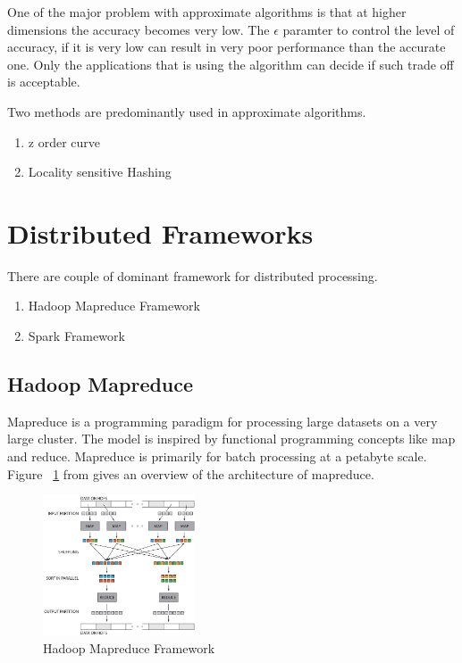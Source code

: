 \documentclass[conference]{IEEEtran}
\begin{document}
\medskip

One of the major problem with approximate algorithms is that at higher
dimensions the accuracy becomes very low. The $\epsilon$ paramter to
control the level of accuracy, if it is very low can result in very
poor performance than the accurate one. Only the applications that is
using the algorithm can decide if such trade off is acceptable.

\medskip

Two methods are predominantly
used in approximate algorithms.
\begin{enumerate}
\item z order curve
\item Locality sensitive Hashing
\end{enumerate}

\bigskip

\section{Distributed Frameworks}

There are couple of dominant framework for distributed processing.
\begin{enumerate}
\item Hadoop Mapreduce Framework \cite{_hadoop_mr}
\item Spark Framework \cite{_apache_spark}
\end{enumerate}

\subsection{Hadoop Mapreduce}
Mapreduce\cite{dean_mapreduce:_2008} is a programming paradigm for processing large datasets on a
very large cluster. The model is inspired by functional programming concepts like
map and reduce. Mapreduce is primarily for batch processing at a
petabyte scale. Figure ~\ref{fig:hadooparch} from \cite{_hadoop_mr_arch} gives an overview of the architecture of
mapreduce.

\begin{figure}[here]
\includegraphics[width=0.4\textwidth]{hadooparch.jpg}
\caption{Hadoop Mapreduce Framework}
\label{fig:hadooparch}
\end{figure}
\end{document}
